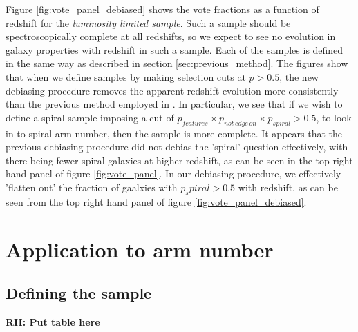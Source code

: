 \documentclass[useAMS,usenatbib]{mn2e}
\newcommand{\rh}[1]{{\bf \textcolor{RoyalPurple}{RH: #1}}}
\begin{document}
Figure \ref{fig:vote_panel_debiased} shows the vote fractions as a function of redshift for the \textit{luminosity limited sample}. Such a sample should be spectroscopically complete at all redshifts, so we expect to see no evolution in galaxy properties with redshift in such a sample. Each of the samples is defined in the same way as described in section \ref{sec:previous_method}. The figures show that when we define samples by making selection cuts at $p>0.5$, the new debiasing procedure removes the apparent redshift evolution more consistently than the previous method employed in \citet{Willett_13}. In particular, we see that if we wish to define a spiral sample imposing a cut of $p_{features} \times p_{not \, edge \, on} \times p_{spiral} > 0.5$, to look in to spiral arm number, then the sample is more complete. It appears that the previous debiasing procedure did not debias the 'spiral' question effectively, with there being fewer spiral galaxies at higher redshift, as can be seen in the top right hand panel of figure \ref{fig:vote_panel}. In our debiasing procedure, we effectively 'flatten out' the fraction of gaalxies with $p_spiral>0.5$ with redshift, as can be seen from the top right hand panel of figure \ref{fig:vote_panel_debiased}. 


\section{Application to arm number}
\label{sec:results}


\subsection{Defining the sample}

\rh{Put table here}
\end{document}

